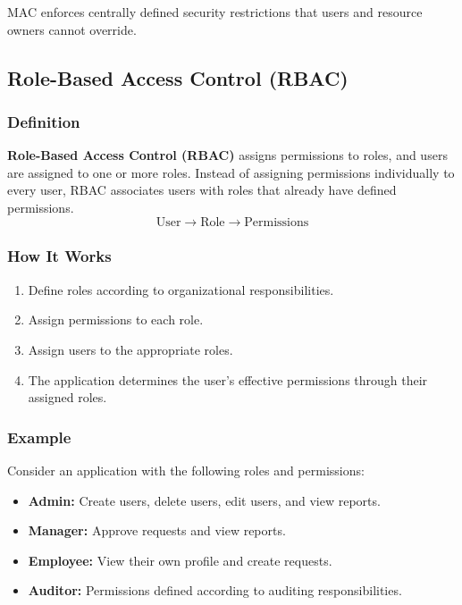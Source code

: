 \documentclass[11pt,a4paper]{article}
\begin{document}
MAC enforces centrally defined security restrictions that users and resource owners cannot override.

\subsection{Role-Based Access Control (RBAC)}

\subsubsection{Definition}

\textbf{Role-Based Access Control (RBAC)} assigns permissions to roles, and users are assigned to one or more roles.
Instead of assigning permissions individually to every user, RBAC associates users with roles that already have defined permissions.
\[
    \text{User} \rightarrow \text{Role} \rightarrow \text{Permissions}
\]

\subsubsection{How It Works}

\begin{enumerate}
    \item Define roles according to organizational responsibilities.
    \item Assign permissions to each role.
    \item Assign users to the appropriate roles.
    \item The application determines the user's effective permissions through their assigned roles.
\end{enumerate}

\subsubsection{Example}

Consider an application with the following roles and permissions:
\begin{itemize}
    \item \textbf{Admin:} Create users, delete users, edit users, and view reports.
    \item \textbf{Manager:} Approve requests and view reports.
    \item \textbf{Employee:} View their own profile and create requests.
    \item \textbf{Auditor:} Permissions defined according to auditing responsibilities.
\end{itemize}
\end{document}
